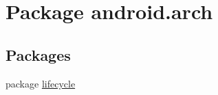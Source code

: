 \hypertarget{namespaceandroid_1_1arch}{}\section{Package android.\+arch}
\label{namespaceandroid_1_1arch}
\subsection*{Packages}
\begin{DoxyCompactItemize}
\item 
package \mbox{\hyperlink{namespaceandroid_1_1arch_1_1lifecycle}{lifecycle}}
\end{DoxyCompactItemize}
